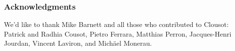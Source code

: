 \documentclass{llncs}
\begin{document}
\subsubsection{Acknowledgments} 
We'd like to thank Mike Barnett and all those who contributed to
Clousot: Patrick and Radhia Cousot, Pietro Ferrara, Matthias Perron, Jacques-Henri
Jourdan, Vincent Laviron, and Mich\"{a}el Monerau.



\end{document}

